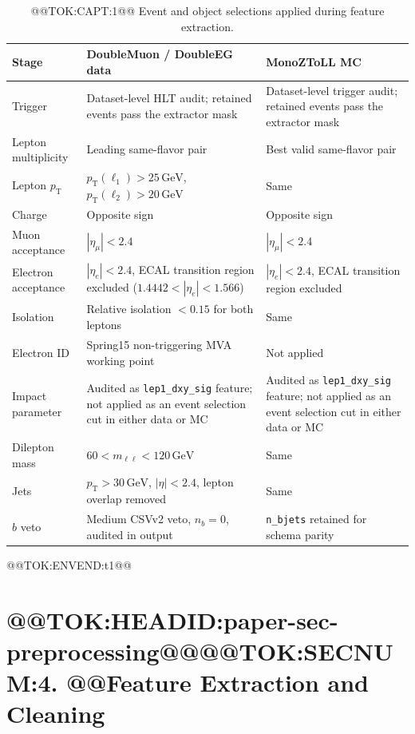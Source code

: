 \documentclass[11pt]{article}
\newcommand{\GeV}{\text{GeV}}
\begin{document}
\begin{table}[!tbp]
\centering
\caption{@@TOK:CAPT:1@@ Event and object selections applied during feature extraction.}
\label{tab:extraction-cuts}

\begin{tabular}{p{} p{} p{}}
\toprule
Stage & DoubleMuon / DoubleEG data & MonoZToLL MC \\
\midrule
Trigger & Dataset-level HLT audit; retained events pass the extractor mask &
Dataset-level trigger audit; retained events pass the extractor mask \\
Lepton multiplicity & Leading same-flavor pair & Best valid same-flavor pair \\
Lepton $p_{\mathrm{T}}$ & $p_{\mathrm{T}}(\ell_1)>25\,\GeV$, $p_{\mathrm{T}}(\ell_2)>20\,\GeV$ &
Same \\
Charge & Opposite sign & Opposite sign \\
Muon acceptance & $|\eta_{\mu}|<2.4$ & $|\eta_{\mu}|<2.4$ \\
Electron acceptance & $|\eta_e|<2.4$, ECAL transition region excluded ($1.4442<|\eta_e|<1.566$) & $|\eta_e|<2.4$, ECAL transition region excluded \\
Isolation & Relative isolation $<0.15$ for both leptons & Same \\
Electron ID & Spring15 non-triggering MVA working point & Not applied \\
Impact parameter & Audited as \texttt{lep1\_dxy\_sig} feature; not applied as an event selection cut in either data or MC & Audited as \texttt{lep1\_dxy\_sig} feature; not applied as an event selection cut in either data or MC \\
Dilepton mass & $60<m_{\ell\ell}<120\,\GeV$ & Same \\
Jets & $p_{\mathrm{T}}>30\,\GeV$, $|\eta|<2.4$, lepton overlap removed & Same \\
$b$ veto & Medium CSVv2 veto, $n_b=0$, audited in output & \texttt{n\_bjets} retained for schema parity \\
\bottomrule
\end{tabular}

@@TOK:ENVEND:t1@@\end{table}

\section{@@TOK:HEADID:paper-sec-preprocessing@@@@TOK:SECNUM:4. @@Feature Extraction and Cleaning}
\end{document}
